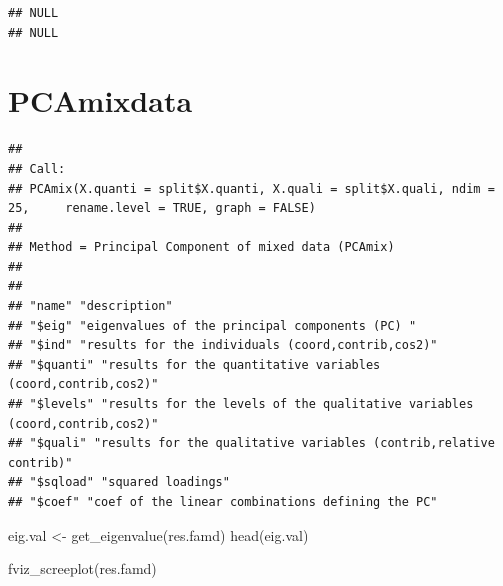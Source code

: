 \documentclass[
]{article}
\newenvironment{Shaded}{\begin{snugshade}}{\end{snugshade}}
\newcommand{\CommentTok}[1]{\textcolor[rgb]{0.56,0.35,0.01}{\textit{#1}}}
\newcommand{\DataTypeTok}[1]{\textcolor[rgb]{0.13,0.29,0.53}{#1}}
\newcommand{\DecValTok}[1]{\textcolor[rgb]{0.00,0.00,0.81}{#1}}
\newcommand{\KeywordTok}[1]{\textcolor[rgb]{0.13,0.29,0.53}{\textbf{#1}}}
\newcommand{\NormalTok}[1]{#1}
\newcommand{\OperatorTok}[1]{\textcolor[rgb]{0.81,0.36,0.00}{\textbf{#1}}}
\newcommand{\OtherTok}[1]{\textcolor[rgb]{0.56,0.35,0.01}{#1}}
\newcommand{\StringTok}[1]{\textcolor[rgb]{0.31,0.60,0.02}{#1}}
\begin{document}
\begin{verbatim}
## NULL
## NULL
\end{verbatim}

\hypertarget{pcamixdata}{%
\section{PCAmixdata}\label{pcamixdata}}

\begin{Shaded}
\end{Shaded}

\begin{verbatim}
## 
## Call:
## PCAmix(X.quanti = split$X.quanti, X.quali = split$X.quali, ndim = 25,     rename.level = TRUE, graph = FALSE)
## 
## Method = Principal Component of mixed data (PCAmix)
## 
## 
## "name" "description"
## "$eig" "eigenvalues of the principal components (PC) "
## "$ind" "results for the individuals (coord,contrib,cos2)"
## "$quanti" "results for the quantitative variables (coord,contrib,cos2)"
## "$levels" "results for the levels of the qualitative variables (coord,contrib,cos2)"
## "$quali" "results for the qualitative variables (contrib,relative contrib)"
## "$sqload" "squared loadings"
## "$coef" "coef of the linear combinations defining the PC"
\end{verbatim}

eig.val \textless- get\_eigenvalue(res.famd) head(eig.val)

fviz\_screeplot(res.famd)
\end{document}
